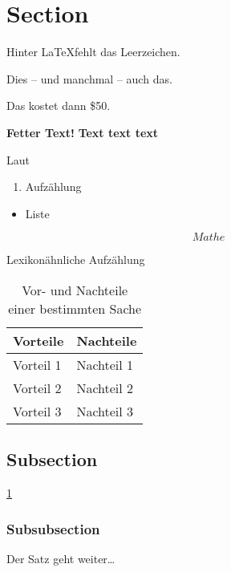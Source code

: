 

\section{Section}

Hinter \LaTeX \@ fehlt das Leerzeichen.

Dies -- und manchmal -- auch das.

Das kostet dann \$50.

\textbf{Fetter Text!}
\bfseries
Text text text
\normalfont %

Laut \cite{nguyen_machine_2018}


\begin{enumerate}
    \item Aufzählung
\end{enumerate}

\begin{itemize}
    \item Liste
\end{itemize}

\begin{equation}
    Mathe
\end{equation}

\begin{description}
    \item[Lexikonähnliche Aufzählung]
\end{description}


\begin{table}[h]
    \centering
    \begin{tabular}{|p{5cm}|p{5cm}|} 
        \hline
        \textbf{Vorteile} & \textbf{Nachteile} \\
        \hline
        Vorteil 1 & Nachteil 1 \\
        Vorteil 2 & Nachteil 2 \\
        Vorteil 3 & Nachteil 3 \\
        \hline
    \end{tabular}
    \caption{Vor- und Nachteile einer bestimmten Sache}
    \label{tab:beispiel}
\end{table}



    \subsection{Subsection}
    \lipsum[1]
    \ref{tab:beispiel}
    
        \subsubsection{Subsubsection}
        \lipsum[1] Der Satz geht weiter\dots